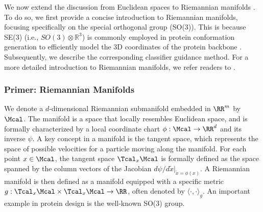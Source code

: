We now extend the discussion from Euclidean spaces to Riemannian manifolds \citep{de2022riemannian,yim2023se,chen2023riemannian}. To do so, we first provide a concise introduction to Riemannian manifolds, focusing specifically on the special orthogonal group (SO(3)). This is because SE(3) (i.e., $SO(3) \otimes \mathbb{R}^3$) is commonly employed in protein conformation generation to efficiently model the 3D coordinates of the protein backbone \citep{yim2023se,watson2023novo}. Subsequently, we describe the corresponding classifier guidance method. For a more detailed introduction to Riemannian manifolds, we refer readers to \citep{lee2018introduction}. 

\subsubsection{Primer: Riemannian Manifolds}

We denote a $d$-dimensional Riemannian submanifold embedded in $\RR^m$ by $\Mcal$. The manifold is a space that locally resembles Euclidean space, and is formally characterized by a local coordinate chart $\phi: \Mcal \to \RR^d$ and its inverse $\psi$. A key concept in a manifold is the tangent space, which represents the space of possible velocities for a particle moving along the manifold. For each point $x \in \Mcal$, the tangent space $\Tcal_x\Mcal$ is formally defined as the space spanned by the column vectors of the Jacobian $d\psi/d\tilde x |_{\tilde x=\phi(x)}$. A Riemannian manifold is then defined as a manifold equipped with a specific metric $g: \Tcal_x\Mcal \times \Tcal_x\Mcal \to \RR$, often denoted by $\langle\cdot,\cdot\rangle_g$. An important example in protein design is the well-known SO(3) group. 


\renewcommand\thmcontinues[1]{Continued}

